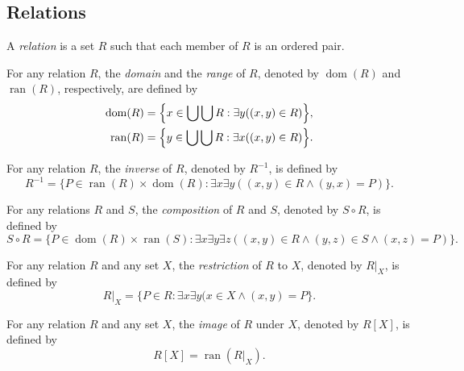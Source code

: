 \documentclass[11pt]{article}
\DeclareMathOperator{\dom}{dom}
\DeclareMathOperator{\ran}{ran}
\begin{document}
\subsection{Relations}
\begin{definition}
  A \emph{relation} is a set $R$ such that each member of $R$ is an ordered pair.
\end{definition}

\begin{definition}
  For any relation $R$, the \emph{domain} and the \emph{range} of $R$, denoted by $\dom(R)$ and $\ran(R)$, respectively, are defined by
  \begin{align*}
    \dom(R) &= \Bigl\{x \in \bigcup \bigcup R: \exists y ((x, y) \in R) \Bigr\}, \\
    \ran(R) &= \Bigl\{y \in \bigcup \bigcup R: \exists x ((x, y) \in R) \Bigr\}.
  \end{align*}
\end{definition}

\begin{definition}
  For any relation $R$, the \emph{inverse} of $R$, denoted by $R^{-1}$, is defined by
  \begin{equation*}
    R^{-1} = \{P \in \ran(R) \times \dom(R): \exists x \exists y ((x, y) \in R \wedge (y, x) = P)\}.
  \end{equation*}
\end{definition}

\begin{definition}
  For any relations $R$ and $S$, the \emph{composition} of $R$ and $S$, denoted by $S \circ R$, is defined by
  \begin{equation*}
    S \circ R = \{P \in \dom(R) \times \ran(S): \exists x \exists y \exists z ((x, y) \in R \wedge (y, z) \in S \wedge (x, z) = P)\}.
  \end{equation*}
\end{definition}

\begin{definition}
  For any relation $R$ and any set $X$, the \emph{restriction} of $R$ to $X$, denoted by $R|_X$, is defined by
  \begin{equation*}
    R|_X = \{P \in R: \exists x \exists y (x \in X \wedge (x, y) = P\}.
  \end{equation*}
\end{definition}

\begin{definition}
  For any relation $R$ and any set $X$, the \emph{image} of $R$ under $X$, denoted by $R[X]$, is defined by
  \begin{equation*}
    R[X] = \ran(R|_X).
  \end{equation*}
\end{definition}
\end{document}
